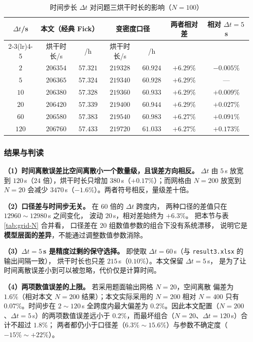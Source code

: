 \documentclass[12pt,a4paper,fontset=none]{ctexart}
\begin{document}
\begin{table}[htbp]
  \centering
  \caption{时间步长 $\Delta t$ 对问题三烘干时长的影响（$N=100$）}
  \label{tab:grid-dt}
  \small
  \begin{tabular}{ccccccc}
    \toprule
    $\Delta t$/s & \multicolumn{2}{c}{本文（经典 Fick）}
      & \multicolumn{2}{c}{变密度口径} & 两者相对差 & 相对 $\Delta t=5$\,s \\
    \cmidrule(lr){2-3}\cmidrule(lr){4-5}
     & 烘干时长/s & /h & 烘干时长/s & /h & & \\
    \midrule
    $2$   & $206354$ & $57.321$ & $219328$ & $60.924$ & $+6.29\%$ & $-0.005\%$ \\
    $5$   & $206365$ & $57.324$ & $219340$ & $60.928$ & $+6.29\%$ & --- \\
    $10$  & $206380$ & $57.328$ & $219360$ & $60.933$ & $+6.29\%$ & $+0.009\%$ \\
    $20$  & $206420$ & $57.339$ & $219400$ & $60.944$ & $+6.29\%$ & $+0.027\%$ \\
    $60$  & $206580$ & $57.383$ & $219540$ & $60.983$ & $+6.27\%$ & $+0.091\%$ \\
    $120$ & $206760$ & $57.433$ & $219720$ & $61.033$ & $+6.27\%$ & $+0.173\%$ \\
    \bottomrule
  \end{tabular}
\end{table}

\subsubsection{结果与判读}

\textbf{（1）时间离散误差比空间离散小一个数量级，且误差方向相反。}
$\Delta t$ 由 $5$\,s 放宽到 $120$\,s（$24$ 倍），烘干时长只增加
$380$\,s（$+0.17\%$）；而网格由 $N=200$ 放宽到 $N=20$ 会减少
$3470$\,s（$-1.6\%$）。两者符号相反，量级差十倍。

\textbf{（2）口径差与时间步无关。} 在 $60$ 倍的 $\Delta t$ 跨度内，
两种口径的差值只在 $12960\sim12980$\,s 之间变化，
波动 $20$\,s，相对差始终为 $+6.3\%$。
把本节与表 \ref{tab:grid-N} 合并看，
口径差在 $20$ 组数值参数的组合下没有系统漂移，
说明它是\textbf{模型层面的差异}，不能通过调整数值参数消除。

\textbf{（3）$\Delta t=5$\,s 是精度过剩的保守选择。}
即使取 $\Delta t=60$\,s（与 \texttt{result3.xlsx} 的输出间隔一致），
烘干时长也只差 $215$\,s（$0.10\%$）。本文保留 $\Delta t=5$\,s，
是为了让时间离散误差小到可以被忽略，代价仅是计算时间。

\textbf{（4）两项数值误差的上限。} 若采用题面输出网格 $N=20$，空间离散
偏差为 $1.6\%$（相对本文 $N=200$ 结果）；本文实际采用的 $N=200$ 相对
$N=400$ 只有 $0.07\%$。时间步在 $2\sim120$\,s 全跨度内最大偏差为
$0.2\%$。因此本文配置（$N=200$、$\Delta t=5$\,s）的两项数值误差远小于
$0.2\%$，而最坏组合（$N=20$、$\Delta t=120$\,s）合计不超过 $1.8\%$；
两者都仍小于口径差（$6.3\%\sim15.6\%$）与参数不确定度（$-15\%\sim+22\%$）。
\end{document}
